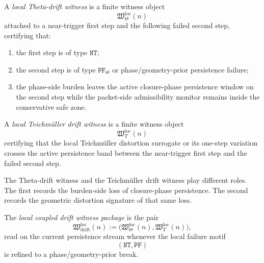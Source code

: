 \begin{definition}
\label{def:local-theta-drift-witness}
A \emph{local Theta-drift witness} is a finite witness object
\[
\mathfrak{W}_{\Theta}^{\mathrm{loc}}(n)
\]
attached to a near-trigger first step and the following failed second step, certifying that:
\begin{enumerate}
 \item the first step is of type \(\mathtt{NT}\);
 \item the second step is of type \(\mathtt{PF}_{\Theta}\) or phase/geometry-prior persistence failure;
 \item the phase-side burden leaves the active closure-phase persistence window on the second step while the packet-side admissibility monitor remains inside the conservative safe zone.
\end{enumerate}
\end{definition}

\begin{definition}
\label{def:local-teichmueller-drift-witness}
A \emph{local Teichm\"uller drift witness} is a finite witness object
\[
\mathfrak{W}_{T}^{\mathrm{loc}}(n)
\]
certifying that the local Teichm\"uller distortion surrogate or its one-step variation crosses the active persistence band between the near-trigger first step and the failed second step.
\end{definition}

\begin{remark}
\label{rem:burden-side-versus-geometric-witness}
The Theta-drift witness and the Teichm\"uller drift witness play different roles.
The first records the burden-side loss of closure-phase persistence.
The second records the geometric distortion signature of that same loss.
\end{remark}

\begin{definition}
\label{def:local-coupled-drift-witness-package}
The \emph{local coupled drift witness package} is the pair
\[
\mathfrak{W}_{\mathrm{drift}}^{\mathrm{loc}}(n)
:=
\bigl(
\mathfrak{W}_{\Theta}^{\mathrm{loc}}(n),
\mathfrak{W}_{T}^{\mathrm{loc}}(n)
\bigr),
\]
read on the current persistence stream whenever the local failure motif
\[
(\mathtt{NT},\mathtt{PF})
\]
is refined to a phase/geometry-prior break.
\end{definition}

